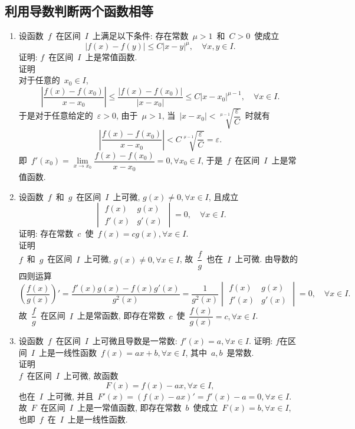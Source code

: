 \documentclass[UTF8,a4paper,20pt]{article}
\begin{document}
\subsection{利用导数判断两个函数相等}
\begin{enumerate}
\item 设函数~$f$~在区间~$I$~上满足以下条件: 存在常数~$\mu>1$~和~$C>0$~使成立
\[ |f(x)-f(y)|\leqslant C|x-y|^{\mu}, \quad \forall x,y\in I.\]
证明: $f$~在区间~$I$~上是常值函数.\\
{\heiti 证明}\\
对于任意的~$x_0\in I$,
\[\left|\dfrac{f(x)-f(x_0)}{x-x_0}\right|\leqslant \dfrac{|f(x)-f(x_0)|}{|x-x_0|}\leqslant C|x-x_0|^{\mu-1}, \quad\forall x\in I.\]
于是对于任意给定的~$\varepsilon>0$, 由于~$\mu>1$, 当~$|x-x_0|<\sqrt[\mu-1]{\dfrac{\varepsilon}{C}}$~时就有
\[\left|\dfrac{f(x)-f(x_0)}{x-x_0}\right|< C\sqrt[\mu-1]{\dfrac{\varepsilon}{C}}=\varepsilon.\]
即~$f'(x_0)=\lim\limits_{x\to x_0} \dfrac{f(x)-f(x_0)}{x-x_0}=0, \forall x_0\in I$, 于是~$f$~在区间~$I$~上是常值函数.

\item 设函数~$f$~和~$g$~在区间~$I$~上可微, $g(x)\neq 0, \forall x\in I$, 且成立
\[ \begin{vmatrix} f(x) & g(x)\\f'(x) & g'(x)\end{vmatrix}=0,\quad \forall x\in I.\]
证明: 存在常数~$c$~使~$f(x)=cg(x), \forall x\in I$.\\
{\heiti 证明}\\
$f$~和~$g$~在区间~$I$~上可微, $g(x)\neq 0, \forall x\in I$, 故~$\dfrac{f}{g}$~也在~$I$~上可微. 由导数的四则运算
\[ \left(\dfrac{f(x)}{g(x)}\right)'=\dfrac{f'(x)g(x)-f(x)g'(x)}{g^2(x)}=\dfrac{1}{g^2(x)}\begin{vmatrix} f(x) & g(x)\\f'(x) & g'(x)\end{vmatrix}=0,\quad \forall x\in I.\]
故~$\dfrac{f}{g}$~在区间~$I$~上是常函数, 即存在常数~$c$~使~$\dfrac{f(x)}{g(x)}=c, \forall x\in I$.

\item 设函数~$f$~在区间~$I$~上可微且导数是一常数: $f'(x)=a, \forall x\in I$. 证明: $f$在区间~$I$~上是一线性函数~$f(x)=ax+b, \forall x\in I$, 其中~$a, b$~是常数.\\
{\heiti 证明}\\
$f$~在区间~$I$~上可微, 故函数
\[F(x)=f(x)-ax, \forall x\in I,\]
也在~$I$~上可微, 并且~$F'(x)=(f(x)-ax)'=f'(x)-a=0, \forall x\in I$. 故~$F$~在区间~$I$~上是一常值函数, 即存在常数~$b$~使成立~$F(x)=b, \forall x\in I$, 也即~$f$~在~$I$~上是一线性函数.
 

\end{enumerate}
\end{document}
